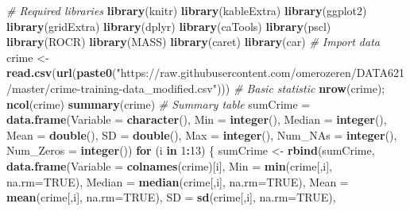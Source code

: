 \documentclass[]{article}
\newenvironment{Shaded}{\begin{snugshade}}{\end{snugshade}}
\newcommand{\CommentTok}[1]{\textcolor[rgb]{0.56,0.35,0.01}{\textit{#1}}}
\newcommand{\ControlFlowTok}[1]{\textcolor[rgb]{0.13,0.29,0.53}{\textbf{#1}}}
\newcommand{\DataTypeTok}[1]{\textcolor[rgb]{0.13,0.29,0.53}{#1}}
\newcommand{\DecValTok}[1]{\textcolor[rgb]{0.00,0.00,0.81}{#1}}
\newcommand{\KeywordTok}[1]{\textcolor[rgb]{0.13,0.29,0.53}{\textbf{#1}}}
\newcommand{\NormalTok}[1]{#1}
\newcommand{\OperatorTok}[1]{\textcolor[rgb]{0.81,0.36,0.00}{\textbf{#1}}}
\newcommand{\OtherTok}[1]{\textcolor[rgb]{0.56,0.35,0.01}{#1}}
\newcommand{\StringTok}[1]{\textcolor[rgb]{0.31,0.60,0.02}{#1}}
\begin{document}
\begin{Shaded}
\begin{Highlighting}[]
\CommentTok{# Required libraries}
\KeywordTok{library}\NormalTok{(knitr)}
\KeywordTok{library}\NormalTok{(kableExtra)}
\KeywordTok{library}\NormalTok{(ggplot2)}
\KeywordTok{library}\NormalTok{(gridExtra)}
\KeywordTok{library}\NormalTok{(dplyr)}
\KeywordTok{library}\NormalTok{(caTools)}
\KeywordTok{library}\NormalTok{(pscl)}
\KeywordTok{library}\NormalTok{(ROCR)}
\KeywordTok{library}\NormalTok{(MASS)}
\KeywordTok{library}\NormalTok{(caret)}
\KeywordTok{library}\NormalTok{(car)}
\CommentTok{# Import data}
\NormalTok{crime <-}\StringTok{ }\KeywordTok{read.csv}\NormalTok{(}\KeywordTok{url}\NormalTok{(}\KeywordTok{paste0}\NormalTok{(}\StringTok{"https://raw.githubusercontent.com/omerozeren/DATA621/master/crime-training-data_modified.csv"}\NormalTok{)))}
\CommentTok{# Basic statistic}
\KeywordTok{nrow}\NormalTok{(crime); }\KeywordTok{ncol}\NormalTok{(crime)}
\KeywordTok{summary}\NormalTok{(crime)}
\CommentTok{# Summary table}
\NormalTok{sumCrime =}\StringTok{ }\KeywordTok{data.frame}\NormalTok{(}\DataTypeTok{Variable =} \KeywordTok{character}\NormalTok{(),}
                      \DataTypeTok{Min =} \KeywordTok{integer}\NormalTok{(),}
                      \DataTypeTok{Median =} \KeywordTok{integer}\NormalTok{(),}
                      \DataTypeTok{Mean =} \KeywordTok{double}\NormalTok{(),}
                      \DataTypeTok{SD =} \KeywordTok{double}\NormalTok{(),}
                      \DataTypeTok{Max =} \KeywordTok{integer}\NormalTok{(),}
                      \DataTypeTok{Num_NAs =} \KeywordTok{integer}\NormalTok{(),}
                      \DataTypeTok{Num_Zeros =} \KeywordTok{integer}\NormalTok{())}
\ControlFlowTok{for}\NormalTok{ (i }\ControlFlowTok{in} \DecValTok{1}\OperatorTok{:}\DecValTok{13}\NormalTok{) \{}
\NormalTok{  sumCrime <-}\StringTok{ }\KeywordTok{rbind}\NormalTok{(sumCrime, }\KeywordTok{data.frame}\NormalTok{(}\DataTypeTok{Variable =} \KeywordTok{colnames}\NormalTok{(crime)[i],}
                                         \DataTypeTok{Min =} \KeywordTok{min}\NormalTok{(crime[,i], }\DataTypeTok{na.rm=}\OtherTok{TRUE}\NormalTok{),}
                                         \DataTypeTok{Median =} \KeywordTok{median}\NormalTok{(crime[,i], }\DataTypeTok{na.rm=}\OtherTok{TRUE}\NormalTok{),}
                                         \DataTypeTok{Mean =} \KeywordTok{mean}\NormalTok{(crime[,i], }\DataTypeTok{na.rm=}\OtherTok{TRUE}\NormalTok{),}
                                         \DataTypeTok{SD =} \KeywordTok{sd}\NormalTok{(crime[,i], }\DataTypeTok{na.rm=}\OtherTok{TRUE}\NormalTok{),}

\end{Highlighting}
\end{Shaded}
\end{document}

